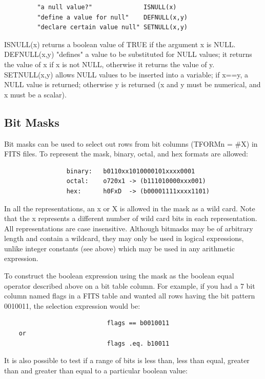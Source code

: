 \documentclass[11pt]{book}
\begin{document}
\begin{verbatim}
         "a null value?"              ISNULL(x)
         "define a value for null"    DEFNULL(x,y)
         "declare certain value null" SETNULL(x,y)
\end{verbatim}
    ISNULL(x)
    returns a boolean value of TRUE if the  argument  x  is  NULL. DEFNULL(x,y)
    "defines"  a  value  to  be  substituted  for NULL values; it
    returns the value of x if x is not NULL, otherwise  it  returns  the
    value of y.  SETNULL(x,y) allows NULL values to be inserted into
    a variable; if x==y, a NULL value is returned; otherwise y is returned
    (x and y must be numerical, and x must be a scalar).

\subsection{Bit Masks}

    Bit  masks can be used to select out rows from bit columns (TFORMn =
    \#X) in FITS files. To represent the mask,  binary,  octal,  and  hex
    formats are allowed:


\begin{verbatim}
                 binary:   b0110xx1010000101xxxx0001
                 octal:    o720x1 -> (b111010000xxx001)
                 hex:      h0FxD  -> (b00001111xxxx1101)
\end{verbatim}

    In  all  the  representations, an x or X is allowed in the mask as a
    wild card. Note that the x represents a  different  number  of  wild
    card  bits  in  each  representation.  All  representations are case
    insensitive.  Although bitmasks may be of arbitrary length and contain
    a wildcard, they may only be used in logical expressions, unlike
    integer constants (see above) which may be used in any arithmetic
    expression.

    To construct the boolean expression using the mask  as  the  boolean
    equal  operator  described above on a bit table column. For example,
    if you had a 7 bit column named flags in a  FITS  table  and  wanted
    all  rows  having  the bit pattern 0010011, the selection expression
    would be:


\begin{verbatim}
                            flags == b0010011
    or
                            flags .eq. b10011
\end{verbatim}

    It is also possible to test if a range of bits is  less  than,  less
    than  equal,  greater  than  and  greater than equal to a particular
    boolean value:
\end{document}
